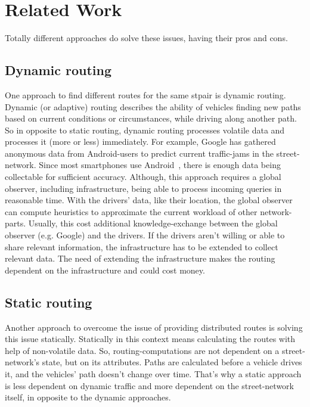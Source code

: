 \section{Related Work}

    Totally different approaches do solve these issues, having their pros and cons.

    \subsection{Dynamic routing}

        One approach to find different routes for the same \gls{stpair} is dynamic routing.
        Dynamic (or adaptive) routing describes the ability of vehicles finding new paths based on current conditions or circumstances, while driving along another path.
        So in opposite to static routing, dynamic routing processes volatile data and processes it (more or less) immediately.
        For example, Google has gathered~\cite{barth:google-traffic} anonymous data from Android-users to predict current traffic-jams in the street-network.
        Since most smartphones use Android~\cite{kantar:android-vs-ios}, there is enough data being collectable for sufficient accuracy.
        Although, this approach requires a global observer, including infrastructure, being able to process incoming queries in reasonable time.
        With the drivers' data, like their location, the global observer can compute heuristics to approximate the current workload of other network-parts.
        Usually, this cost additional knowledge-exchange between the global observer (e.g. Google) and the drivers.
        If the drivers aren't willing or able to share relevant information, the infrastructure has to be extended to collect relevant data.
        The need of extending the infrastructure makes the routing dependent on the infrastructure and could cost money.

    \subsection{Static routing}

        Another approach to overcome the issue of providing distributed routes is solving this issue statically.
        Statically in this context means calculating the routes with help of non-volatile data.
        So, routing-computations are not dependent on a street-network's state, but on its attributes.
        Paths are calculated before a vehicle drives it, and the vehicles' path doesn't change over time.
        That's why a static approach is less dependent on dynamic traffic and more dependent on the street-network itself, in opposite to the dynamic approaches.

